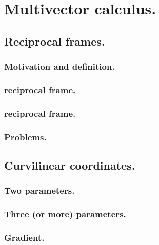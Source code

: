 %
%
\chapter{Multivector calculus.}
   \section{Reciprocal frames.}
      \subsection{Motivation and definition.}
         
         
      \subsection{ reciprocal frame.}
         
      \subsection{ reciprocal frame.}
         
      \subsection{Problems.}
         
         
   \section{Curvilinear coordinates.}
      \subsection{Two parameters.}
         
      \subsection{Three (or more) parameters.}
         
      \subsection{Gradient.}
         
